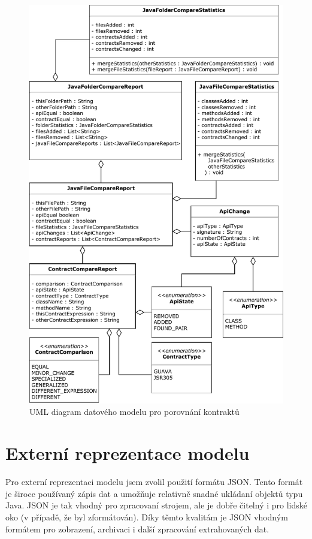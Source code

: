 		
				\begin{figure}[!htb]
						\centering
						\includegraphics[width=1\textwidth]{img/modelComparatorDiagram.pdf}
						\caption[modelComparatorDiagram]{UML diagram datového modelu pro porovnání kontraktů}
						\label{modelComparatorDiagram}
					\endminipage\hfill
				\end{figure}

			
		\section{Externí reprezentace modelu}
			Pro externí reprezentaci modelu jsem zvolil použití formátu JSON. Tento formát je široce používaný zápis dat a umožňuje relativně snadné ukládaní objektů typu Java. JSON je tak vhodný pro zpracovaní strojem, ale je dobře čitelný i pro lidské oko (v případě, že byl zformátován). Díky těmto kvalitám je JSON vhodným formátem pro zobrazení, archivaci i další zpracování extrahovaných dat.\\
			
